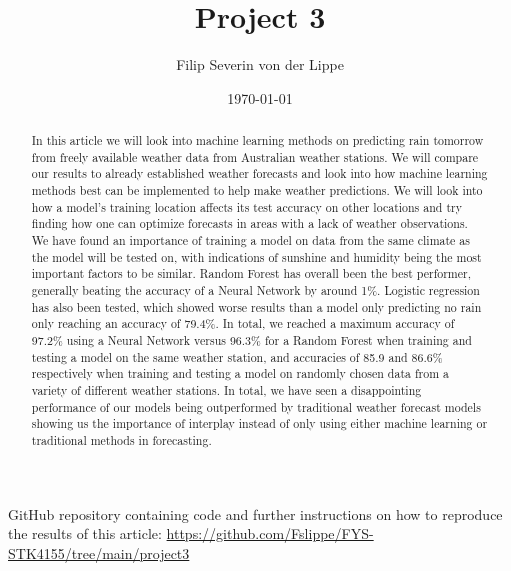 \documentclass[11pt]{article}
\title{Project 3\\ }
\author{Filip Severin von der Lippe}
\date{\today}
\begin{document}
\maketitle
GitHub repository containing code and further instructions on how to reproduce the results of this article: \url{https://github.com/Fslippe/FYS-STK4155/tree/main/project3}

\begin{abstract}
    In this article we will look into machine learning methods on predicting rain tomorrow from freely available weather data from Australian weather stations. We will compare our results to already established weather forecasts and look into how machine learning methods best can be implemented to help make weather predictions. We will look into how a model's training location affects its test accuracy on other locations and try finding how one can optimize forecasts in areas with a lack of weather observations. We have found an importance of training a model on data from the same climate as the model will be tested on, with indications of sunshine and humidity being the most important factors to be similar. Random Forest has overall been the best performer, generally beating the accuracy of a Neural Network by around 1\%. Logistic regression has also been tested, which showed worse results than a model only predicting no rain only reaching an accuracy of 79.4\%. In total, we reached a maximum accuracy of 97.2\% using a Neural Network versus 96.3\% for a Random Forest when training and testing a model on the same weather station, and accuracies of 85.9 and 86.6\% respectively when training and testing a model on randomly chosen data from a variety of different weather stations. In total, we have seen a disappointing performance of our models being outperformed by traditional weather forecast models showing us the importance of interplay instead of only using either machine learning or traditional methods in forecasting.
\end{abstract}
\newpage
\tableofcontents
\newpage
\end{document}

